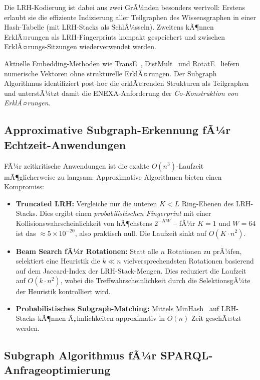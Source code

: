 ﻿\documentclass[a4paper,12pt]{article}
\theoremstyle{definition}
\begin{document}
Die LRH-Kodierung ist dabei aus zwei GrÃ¼nden besonders wertvoll: Erstens erlaubt
sie die effiziente Indizierung aller Teilgraphen des Wissensgraphen in einer
Hash-Tabelle (mit LRH-Stacks als SchlÃ¼sseln). Zweitens kÃ¶nnen ErklÃ¤rungen als
LRH-Fingerprints kompakt gespeichert und zwischen ErklÃ¤rungs-Sitzungen
wiederverwendet werden.

Aktuelle Embedding-Methoden wie TransE~\cite{bordes2013}, DistMult~\cite{yang2014}
und RotatE~\cite{sun2019} liefern numerische Vektoren ohne strukturelle ErklÃ¤rungen.
Der Subgraph Algorithmus identifiziert post-hoc die erklÃ¤renden Strukturen als
Teilgraphen und unterstÃ¼tzt damit die ENEXA-Anforderung der \emph{Co-Konstruktion
von ErklÃ¤rungen}.

\subsection{Approximative Subgraph-Erkennung fÃ¼r Echtzeit-Anwendungen}

FÃ¼r zeitkritische Anwendungen ist die exakte $O(n^3)$-Laufzeit mÃ¶glicherweise zu
langsam. Approximative Algorithmen bieten einen Kompromiss:

\begin{itemize}
  \item \textbf{Truncated LRH:} Vergleiche nur die unteren $K < L$ Ring-Ebenen
        des LRH-Stacks. Dies ergibt einen \emph{probabilistischen Fingerprint}
        mit einer Kollisionswahrscheinlichkeit von hÃ¶chstens $2^{-KW}$ -- fÃ¼r
        $K=1$ und $W=64$ ist das $\approx 5 \times 10^{-20}$, also praktisch null.
        Die Laufzeit sinkt auf $O(K \cdot n^2)$.

  \item \textbf{Beam Search fÃ¼r Rotationen:} Statt alle $n$ Rotationen zu prÃ¼fen,
        selektiert eine Heuristik die $k \ll n$ vielversprechendsten Rotationen
        basierend auf dem Jaccard-Index der LRH-Stack-Mengen. Dies reduziert die
        Laufzeit auf $O(k \cdot n^2)$, wobei die Treffwahrscheinlichkeit durch die
        SelektionsgÃ¼te der Heuristik kontrolliert wird.

  \item \textbf{Probabilistisches Subgraph-Matching:} Mittels MinHash~\cite{broder1997}
        auf LRH-Stacks kÃ¶nnen Ã„hnlichkeiten approximativ in $O(n)$ Zeit geschÃ¤tzt werden.
\end{itemize}

\subsection{Subgraph Algorithmus fÃ¼r SPARQL-Anfrageoptimierung}
\end{document}
